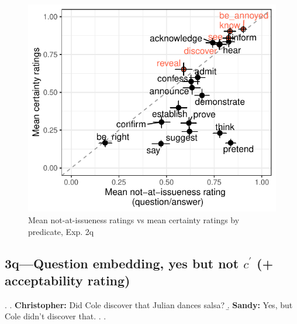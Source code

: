 \documentclass[11pt]{article}
\begin{document}
			\begin{figure}[h]
				\centering
				\includegraphics[]{figures/q2-correl.pdf}
				\caption{Mean not-at-issueness ratings vs mean certainty ratings by predicate, Exp. 2q}
				\label{fig:q2-correl}
			\end{figure}
		

	\subsection{3q---Question embedding, yes but not $c^\prime$ (+ acceptability rating)}
		\ex. \a. \textbf{Christopher:} Did Cole discover that Julian dances salsa?
				\b. \textbf{Sandy:} Yes, but Cole didn't discover that.
				\z.
			\z.
\end{document}
